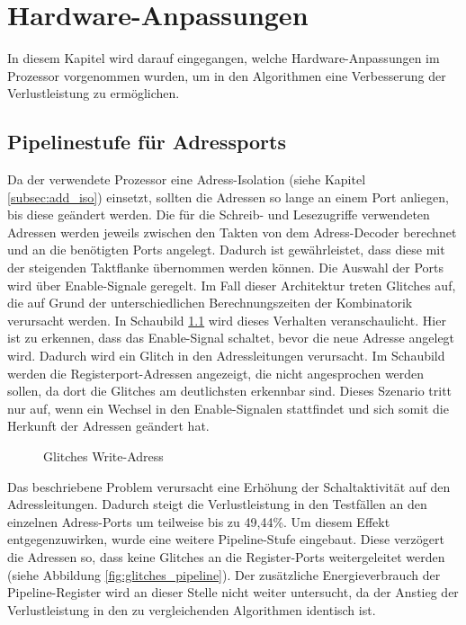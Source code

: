 \chapter{Hardware-Anpassungen}
In diesem Kapitel wird darauf eingegangen, welche Hardware-Anpassungen im Prozessor vorgenommen wurden, um in den Algorithmen eine Verbesserung der Verlustleistung zu ermöglichen.
\section{Pipelinestufe für Adressports}
Da der verwendete Prozessor eine Adress-Isolation (siehe Kapitel \ref{subsec:add_iso}) einsetzt, sollten die Adressen so lange an einem Port anliegen, bis diese geändert werden.
Die für die Schreib- und Lesezugriffe verwendeten Adressen werden jeweils zwischen den Takten von dem Adress-Decoder berechnet und an die benötigten Ports angelegt. Dadurch ist gewährleistet, dass diese mit der steigenden Taktflanke übernommen werden können. Die Auswahl der Ports wird über Enable-Signale geregelt. Im Fall dieser Architektur treten Glitches auf, die auf Grund der unterschiedlichen Berechnungszeiten der Kombinatorik verursacht werden. In Schaubild \ref{fig:glitches} wird dieses Verhalten veranschaulicht. Hier ist zu erkennen, dass das Enable-Signal schaltet, bevor die neue Adresse angelegt wird. Dadurch wird ein Glitch in den Adressleitungen verursacht. Im Schaubild werden die Registerport-Adressen angezeigt, die nicht angesprochen werden sollen, da dort die Glitches am deutlichsten erkennbar sind. Dieses Szenario tritt nur auf, wenn ein Wechsel in den Enable-Signalen stattfindet und sich somit die Herkunft der Adressen geändert hat.

\begin{figure}[H] 
	\centering
	
	\caption{Glitches Write-Adress}
	\label{fig:glitches}
\end{figure}


Das beschriebene Problem verursacht eine Erhöhung der Schaltaktivität auf den Adressleitungen. Dadurch steigt die Verlustleistung in den Testfällen an den einzelnen Adress-Ports um teilweise bis zu 49,44\%.
Um diesem Effekt entgegenzuwirken, wurde eine weitere Pipeline-Stufe eingebaut. Diese verzögert die Adressen so, dass keine Glitches an die Register-Ports weitergeleitet werden (siehe Abbildung \ref{fig:glitches_pipeline}). Der zusätzliche Energieverbrauch der Pipeline-Register wird an dieser Stelle nicht weiter untersucht, da der Anstieg der Verlustleistung in den zu vergleichenden Algorithmen identisch ist.

